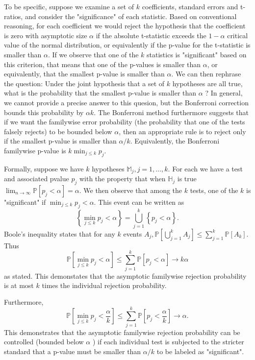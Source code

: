 \documentclass[10pt]{article}
\begin{document}
To be specific, suppose we examine a set of $k$ coefficients, standard errors and t-ratios, and consider the "significance" of each statistic. Based on conventional reasoning, for each coefficient we would reject the hypothesis that the coefficient is zero with asymptotic size $\alpha$ if the absolute t-statistic exceeds the $1-\alpha$ critical value of the normal distribution, or equivalently if the $\mathrm{p}$-value for the t-statistic is smaller than $\alpha$. If we observe that one of the $k$ statistics is "significant" based on this criterion, that means that one of the p-values is smaller than $\alpha$, or equivalently, that the smallest p-value is smaller than $\alpha$. We can then rephrase the question: Under the joint hypothesis that a set of $k$ hypotheses are all true, what is the probability that the smallest $\mathrm{p}$-value is smaller than $\alpha$ ? In general, we cannot provide a precise answer to this quesion, but the Bonferroni correction bounds this probability by $\alpha k$. The Bonferroni method furthermore suggests that if we want the familywise error probability (the probability that one of the tests falsely rejects) to be bounded below $\alpha$, then an appropriate rule is to reject only if the smallest p-value is smaller than $\alpha / k$. Equivalently, the Bonferroni familywise $\mathrm{p}$-value is $k \min _{j \leq k} p_{j}$.

Formally, suppose we have $k$ hypotheses $\mathbb{M}_{j}, j=1, \ldots, k$. For each we have a test and associated pvalue $p_{j}$ with the property that when $\mathbb{H}_{j}$ is true $\lim _{n \rightarrow \infty} \mathbb{P}\left[p_{j}<\alpha\right]=\alpha$. We then observe that among the $k$ tests, one of the $k$ is "significant" if $\min _{j \leq k} p_{j}<\alpha$. This event can be written as
$$
\left\{\min _{j \leq k} p_{j}<\alpha\right\}=\bigcup_{j=1}^{k}\left\{p_{j}<\alpha\right\} .
$$
Boole's inequality states that for any $k$ events $A_{j}, \mathbb{P}\left[\bigcup_{j=1}^{k} A_{j}\right] \leq \sum_{j=1}^{k} \mathbb{P}\left[A_{k}\right]$. Thus
$$
\mathbb{P}\left[\min _{j \leq k} p_{j}<\alpha\right] \leq \sum_{j=1}^{k} \mathbb{P}\left[p_{j}<\alpha\right] \rightarrow k \alpha
$$
as stated. This demonstates that the asymptotic familywise rejection probability is at most $k$ times the individual rejection probability.

Furthermore,
$$
\mathbb{P}\left[\min _{j \leq k} p_{j}<\frac{\alpha}{k}\right] \leq \sum_{j=1}^{k} \mathbb{P}\left[p_{j}<\frac{\alpha}{k}\right] \rightarrow \alpha .
$$
This demonstrates that the asymptotic familywise rejection probability can be controlled (bounded below $\alpha$ ) if each individual test is subjected to the stricter standard that a p-value must be smaller than $\alpha / k$ to be labeled as "significant".
\end{document}
